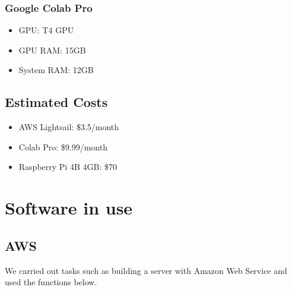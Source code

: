 \subsubsection{\textbf{Google Colab Pro}}
\begin{itemize}
    \item GPU: T4 GPU
    \item GPU RAM: 15GB
    \item System RAM: 12GB
\end{itemize}

\subsection{\textbf{Estimated Costs}}
\begin{itemize}
    \item AWS Lightsail: \$3.5/month
    \item Colab Pro: \$9.99/month
    \item Raspberry Pi 4B 4GB: \$70\\
\end{itemize}


\section{\textbf{Software in use}}
\subsection{\textbf{AWS}}
We carried out tasks such as building a server with Amazon Web Service and used the functions below. \\
